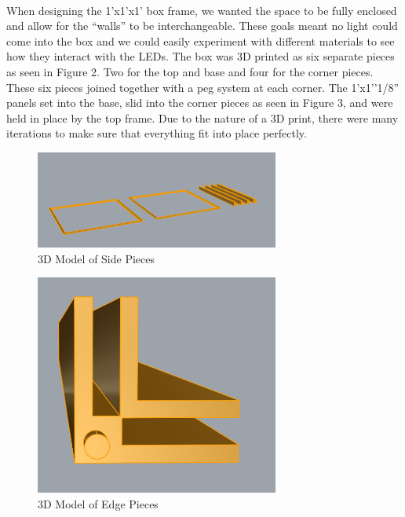 \documentclass{article}
\begin{document}
\paragraph{}When designing the 1’x1’x1’ box frame, we wanted the space to be fully enclosed and allow for the “walls” to be interchangeable. These goals meant no light could come into the box and we could easily experiment with different materials to see how they interact with the LEDs. The box was 3D printed as six separate pieces as seen in Figure 2. Two for the top and base and four for the corner pieces. These six pieces joined together with a peg system at each corner. The 1’x1’’1/8” panels set into the base, slid into the corner pieces as seen in Figure 3, and were held in place by the top frame. Due to the nature of a 3D print, there were many iterations to make sure that everything fit into place perfectly. 
\begin{figure}
    \centering
    \includegraphics[width=0.7143\textwidth]{edges.png}
    \caption{3D Model of Side Pieces}
\end{figure}
\begin{figure}
    \centering
    \includegraphics[width=0.7143\textwidth]{corner.png}
    \caption{3D Model of Edge Pieces}
\end{figure}
\end{document}
